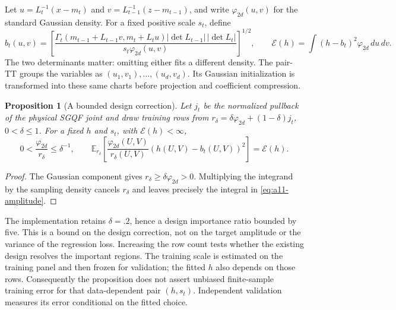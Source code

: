 \documentclass[11pt]{article}
\newtheorem{proposition}{Proposition}
\begin{document}
Let $u=L_t^{-1}(x-m_t)$ and
$v=L_{t-1}^{-1}(z-m_{t-1})$, and write $\varphi_{2d}(u,v)$ for the
standard Gaussian density. For a fixed positive scale $s_t$, define
\begin{equation}
 b_t(u,v)=\left[
 \frac{\Gamma_t(m_{t-1}+L_{t-1}v,m_t+L_tu)
       |\det L_{t-1}|\,|\det L_t|}
      {s_t\varphi_{2d}(u,v)}\right]^{1/2},\qquad
 \mathcal E(h)=\int(h-b_t)^2\varphi_{2d}\,du\,dv.
 \label{eq:a11-amplitude}
\end{equation}
The two determinants matter: omitting either fits a different density.
The pair-TT groups the variables as $(u_1,v_1),\ldots,(u_d,v_d)$.
Its Gaussian initialization is transformed into these same charts before
projection and coefficient compression.

\begin{proposition}[A bounded design correction]
\label{prop:a11-design}
Let $j_t$ be the normalized pullback of the physical SGQF joint and draw
training rows from $r_\delta=\delta\varphi_{2d}+(1-\delta)j_t$,
$0<\delta\le1$. For a fixed $h$ and $s_t$, with $\mathcal E(h)<\infty$,
\begin{equation}
 0<\frac{\varphi_{2d}}{r_\delta}\le\delta^{-1},\qquad
 \mathbb E_{r_\delta}\left[
 \frac{\varphi_{2d}(U,V)}{r_\delta(U,V)}
       (h(U,V)-b_t(U,V))^2\right]=\mathcal E(h).
 \label{eq:a11-design}
\end{equation}
\end{proposition}
\begin{proof}
The Gaussian component gives $r_\delta\ge\delta\varphi_{2d}>0$.
Multiplying the integrand by the sampling density cancels $r_\delta$
and leaves precisely the integral in \eqref{eq:a11-amplitude}.
\end{proof}

The implementation retains $\delta=.2$, hence a design importance ratio
bounded by five. This is a bound on the design correction, not on the target
amplitude or the variance of the regression loss. Increasing the row count
tests whether the existing design resolves the important regions. The
training scale is estimated on the training panel and then frozen for
validation; the fitted $h$ also depends on those rows. Consequently the
proposition does not assert unbiased finite-sample training error for that
data-dependent pair $(h,s_t)$. Independent validation measures its error
conditional on the fitted choice.
\end{document}

